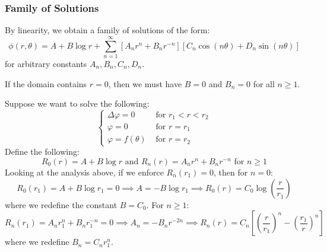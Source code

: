 \documentclass[../main.tex]{subfiles}
\begin{document}
\subsubsection{Family of Solutions}
By linearity, we obtain a family of solutions of the form:
\[
  \phi(r, \theta) = A + B \log r + \sum_{n = 1}^{\infty} [A_n r^n + B_n r^{-n}][C_n \cos(n\theta) + D_n \sin(n \theta)]
\]
for arbitrary constants $A_n, B_n, C_n, D_n$.
\begin{remark}
  If the domain contains $r = 0$, then we must have $B = 0$ and $B_n = 0$ for all $n \geq 1$.
\end{remark}
\begin{example}
  Suppose we want to solve the following:
  \[
    \begin{cases}
    \Delta \varphi = 0 & \text{ for } r_1 < r < r_2 \\
    \varphi = 0 & \text{ for }r = r_1 \\
    \varphi = f(\theta) & \text{ for } r = r_2
    \end{cases}
  \]
  Define the following:
  \[
    R_0(r) = A + B \log r \text{ and } R_n(r) = A_n r^{n} + B_n r^{-n} \text{ for } n \geq 1
  \]
  Looking at the analysis above, if we enforce $R_n(r_1) = 0$, then for $n = 0$:
  \[
    R_0(r_1) = A + B \log r_1 = 0 \implies A = -B \log r_1 \implies R_0(r) = C_0 \log \left(\frac{r}{r_1}\right)
  \]
  where we redefine the constant $B = C_0$.
  For $n \geq 1$:
  \[
    R_n (r_1) = A_n r^{n}_{1} + B_n r^{-n}_{1} = 0 \implies A_n = -B_n r^{-2n} \implies R_n(r) = C_n \left[\left(\frac{r}{r_1}\right)^n - \left(\frac{r_1}{r}\right)^{n}\right]
  \]
  where we redefine $B_n = C_n r^{n}_{1}$.


\end{example}
\end{document}

